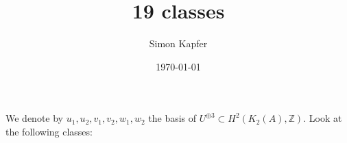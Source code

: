 \documentclass[landscape]{amsart}
\newcommand{\kum}[2]{K_{ #2 }( #1 )}
\newcommand{\Z}{\mathbb{Z}}
\newcommand{\vect}[1]{\left( \begin{smallmatrix} #1 \end{smallmatrix} \right)}
\newcommand{\plan}[2]{\left< \vect{ #1 }, \vect{ #2 } \right>}
\theoremstyle{plain}
\theoremstyle{definition}
\theoremstyle{remark}
\begin{document}
\title{19 classes}

\author{Simon Kapfer}

\date{\today}


\maketitle

We denote by $u_1,u_2,v_1,v_2,w_1,w_2$ the basis of $U^{\oplus 3} \subset H^2(\kum{A}{2},\Z)$. Look at the following classes:

\end{document}
